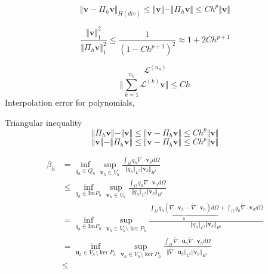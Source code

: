 \begin{equation}
    \Vert \boldsymbol v - \Pi_h \boldsymbol v \Vert_{H(div)} \le \Vert \boldsymbol v \Vert - \Vert \Pi_h \boldsymbol v \Vert \le Ch^{p}\Vert \boldsymbol v \Vert
\end{equation}

\begin{equation}
\frac{\Vert \boldsymbol v \Vert_1^2}{\Vert \Pi_h \boldsymbol v \Vert_1^2} \le \frac{1}{(1-Ch^{p+1})^2} \approx 1 + 2Ch^{p+1}
\end{equation}

\begin{equation}
    \mathcal L^{(n_u)}
\end{equation}
\begin{equation}
    \Vert \sum_{k=1}^{n_u} \mathcal L^{(k)} \boldsymbol v \Vert \le C h
\end{equation}
Interpolation error for polynomials, 

Triangular inequality
\begin{equation}
\Vert \Pi_h \boldsymbol v \Vert - \Vert \boldsymbol v \Vert \le \Vert \boldsymbol v - \Pi_h \boldsymbol v \Vert \le Ch^{p} \Vert \boldsymbol v \Vert
\end{equation}
\begin{equation}
\Vert \boldsymbol v \Vert - \Vert \Pi_h \boldsymbol v \Vert \le \Vert \boldsymbol v - \Pi_h \boldsymbol v \Vert \le Ch^{p} \Vert \boldsymbol v \Vert
\end{equation}


\begin{equation}
\begin{split}
\beta_h &= \inf_{q_h \in Q_h} \sup_{\boldsymbol v_h \in V_h} \frac{\int_{\Omega} q_h \nabla \cdot \boldsymbol v_h d\Omega}{\Vert q_h \Vert_{L^2} \Vert \boldsymbol v_h \Vert_{H^1}} \\
    &\le \inf_{q_h \in \textrm{Im} P_h} \sup_{\boldsymbol v_h \in V_h} \frac{\int_{\Omega} q_h \nabla \cdot \boldsymbol v_h d\Omega}{\Vert q_h \Vert_{L^2} \Vert \boldsymbol v_h \Vert_{H^1}} \\
    &= \inf_{q_h \in \textrm{Im} P_h} \sup_{\boldsymbol v_h \in V_h\setminus \ker P_h} \frac{\underbrace{\int_{\Omega} q_h (\nabla \cdot \boldsymbol v_h - \tilde{\nabla} \cdot \boldsymbol v_h) d\Omega}_{0} + \int_\Omega q_h \tilde{\nabla} \cdot \boldsymbol v_h d\Omega}{\Vert q_h \Vert_{L^2} \Vert \boldsymbol v_h \Vert_{H^1}} \\
    &= \inf_{\boldsymbol u_h \in V_h\setminus \ker P_h} \sup_{\boldsymbol v_h \in V_h\setminus \ker P_h} \frac{\int_{\Omega} \tilde \nabla \cdot \boldsymbol u_h \tilde \nabla \cdot \boldsymbol v_h d\Omega}{\Vert \tilde \nabla \cdot \boldsymbol u_h \Vert_{L^2} \Vert \boldsymbol v_h \Vert_{H^1}} \\
    &\le
\end{split}
\end{equation}

